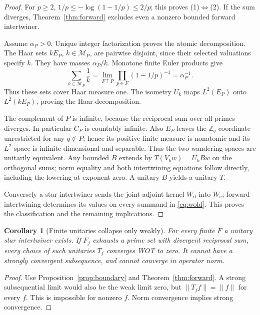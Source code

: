 \documentclass[11pt]{article}
\newtheorem{corollary}[theorem]{Corollary}
\theoremstyle{remark}
\begin{document}
\begin{proof}
For $p\geq2$,
$1/p\leq-\log(1-1/p)\leq2/p$; this proves (1)$\Leftrightarrow$(2).
If the sum diverges, Theorem~\ref{thm:forward} excludes even a nonzero
bounded forward intertwiner.

Assume $\alpha_P>0$.  Unique integer factorization proves the atomic
decomposition.  The Haar sets $kE_P$, $k\in\mathcal M_P$, are pairwise
disjoint, since their selected valuations specify $k$.  They have masses
$\alpha_P/k$.  Monotone finite Euler products give
\[
 \sum_{k\in\mathcal M_P}\frac1k
 =\lim_{F\uparrow P}\prod_{p\in F}(1-1/p)^{-1}
 =\alpha_P^{-1}.
\]
Thus these sets cover Haar measure one.  The isometry $U_k$ maps
$L^2(E_P)$ onto $L^2(kE_P)$, proving the Haar decomposition.

The complement of $P$ is infinite, because the reciprocal sum over all
primes diverges.  In particular $C_P$ is countably infinite.
Also $E_P$ leaves the $\mathbb Z_q$ coordinate unrestricted for any
$q\notin P$; hence its positive finite measure is nonatomic and its
$L^2$ space is infinite-dimensional and separable.  Thus the two wandering
spaces are unitarily equivalent.  Any bounded $B$ extends by
$T(V_kw)=U_kBw$ on the orthogonal sums; norm equality and both
intertwining equations follow directly, including the lowering at
exponent zero.  A unitary $B$ yields a unitary $T$.

Conversely a star intertwiner sends the joint adjoint kernel
$W_{\mathrm d}$ into $W_{\mathrm c}$; forward intertwining determines
its values on every summand in \eqref{eq:wold}.  This proves the
classification and the remaining implications.
\end{proof}

\begin{corollary}[Finite unitaries collapse only weakly]\label{cor:unitary}
For every finite $F$ a unitary star intertwiner exists.  If $F_j$ exhausts
a prime set with divergent reciprocal sum, \emph{every} choice of such
unitaries $T_j$ converges WOT to zero.  It cannot have a strongly
convergent subsequence, and cannot converge in operator norm.
\end{corollary}
\begin{proof}
Use Proposition~\ref{prop:boundary} and Theorem~\ref{thm:forward}.
A strong subsequential limit would also be the weak limit zero, but
$\|T_jf\|=\|f\|$ for every $f$.  This is impossible for nonzero $f$.
Norm convergence implies strong convergence.
\end{proof}
\end{document}
